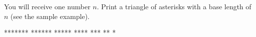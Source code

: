 




You will receive one number $n$. Print a triangle of asterisks with a base length of $n$ (see the sample example).

\vystup
*******
******
*****
****
***
**
*
\koniec

